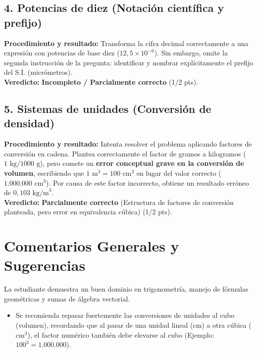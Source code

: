 \documentclass[12pt]{article}
\begin{document}
\subsection*{4. Potencias de diez (Notación científica y prefijo)}
\textbf{Procedimiento y resultado:} Transforma la cifra decimal correctamente a una expresión con potencias de base diez ($12,5 \times 10^{-6}$). Sin embargo, omite la segunda instrucción de la pregunta: identificar y nombrar explícitamente el prefijo del S.I. (micrómetros). \\
\textbf{Veredicto:} \textbf{Incompleto / Parcialmente correcto} (1/2 pts).

\subsection*{5. Sistemas de unidades (Conversión de densidad)}
\textbf{Procedimiento y resultado:} Intenta resolver el problema aplicando factores de conversión en cadena. Plantea correctamente el factor de gramos a kilogramos ($1 \text{ kg} / 1000 \text{ g}$), pero comete un \textbf{error conceptual grave en la conversión de volumen}, escribiendo que $1 \text{ m}^3 = 100 \text{ cm}^3$ en lugar del valor correcto ($1.000.000 \text{ cm}^3$). Por causa de este factor incorrecto, obtiene un resultado erróneo de $0,103 \text{ kg/m}^3$. \\
\textbf{Veredicto:} \textbf{Parcialmente correcto} (Estructura de factores de conversión planteada, pero error en equivalencia cúbica) (1/2 pts).

\vspace{0.5cm}
\section*{Comentarios Generales y Sugerencias}
La estudiante demuestra un buen dominio en trigonometría, manejo de fórmulas geométricas y sumas de álgebra vectorial.
\begin{itemize}
    \item Se recomienda repasar fuertemente las conversiones de unidades al cubo (volumen), recordando que al pasar de una unidad lineal (cm) a otra cúbica ($\text{cm}^3$), el factor numérico también debe elevarse al cubo (Ejemplo: $100^3 = 1.000.000$).
\end{itemize}
\end{document}
